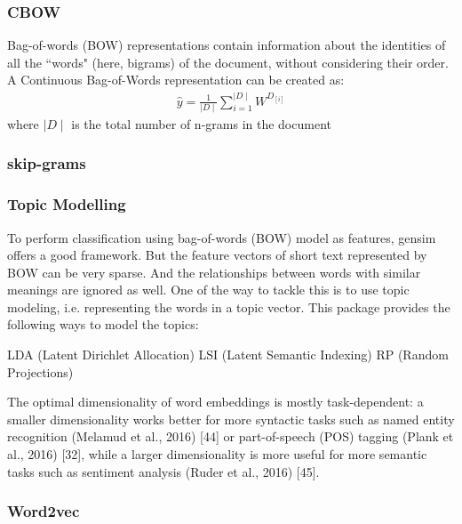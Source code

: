 \documentclass[11pt, oneside]{article}   	%
\begin{document}
\subsubsection{CBOW}

Bag-of-words (BOW) representations contain information about the identities of all the ``words" (here, bigrams) of the document, without considering their order.
A Continuous Bag-of-Words representation can be created as: 
\begin{gather*}
\hat{y} = \frac{1}{\mid D \mid}\sum_{i=1}^{\mid D \mid} W^{D_{[i]}}
\end{gather*} where \begin{math} {\mid D \mid} \end{math}  is the total number of n-grams in the document \\

\subsubsection{skip-grams}

\subsubsection{Topic Modelling}
To perform classification using bag-of-words (BOW) model as features, gensim \cite{gensim} offers  a good framework. But the feature vectors of short text represented by BOW can be very sparse. And the relationships between words with similar meanings are ignored as well. One of the way to tackle this is to use topic modeling, i.e. representing the words in a topic vector. This package provides the following ways to model the topics:

LDA (Latent Dirichlet Allocation)
LSI (Latent Semantic Indexing)
RP (Random Projections)


The optimal dimensionality of word embeddings is mostly task-dependent: a smaller dimensionality works better for more syntactic tasks such as named entity recognition (Melamud et al., 2016) [44] or part-of-speech (POS) tagging (Plank et al., 2016) [32], while a larger dimensionality is more useful for more semantic tasks such as sentiment analysis (Ruder et al., 2016) [45].

\newpage
\subsubsection{Word2vec}
\end{document}
